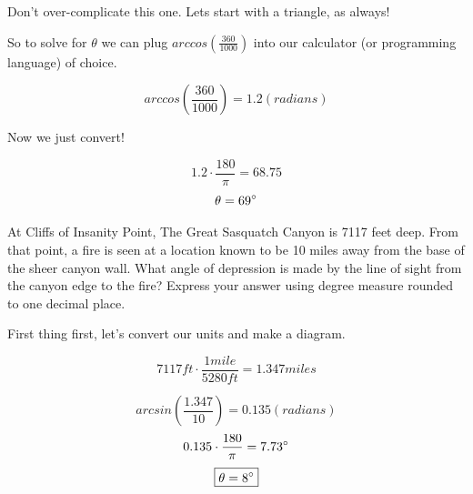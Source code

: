\documentclass[10pt,letterpaper]{amspset}
\begin{document}
\begin{solution}
    Don't over-complicate this one. Lets start with a triangle, as always!    
    
    
    So to solve for $\theta$ we can plug $arccos \left( \frac{360}{1000} \right)$ into our calculator (or programming language) of choice. 
    
    \[ arccos \left( \frac{360}{1000} \right) = 1.2 (radians)\]
    
    Now we just convert! 
    
    \[1.2 \cdot \frac{180}{\pi} = 68.75\]
    \[ \theta = 69\degree\]
\end{solution}


\begin{problem}[212]
    At Cliffs of Insanity Point, The Great Sasquatch Canyon is 7117 feet deep. From that point, a fire is seen at a location known to be 10 miles away from the base of the sheer canyon wall. What angle of depression is made by the line of sight from the canyon edge to the fire? Express your answer using degree measure rounded to one decimal place.
\end{problem}

\begin{solution}
    First thing first, let's convert our units and make a diagram. 
    
    \[ 7117ft \cdot \frac{1mile}{5280ft} = 1.347 miles\]
    
    
    
    \[ arcsin \left( \frac{1.347}{10} \right) = 0.135 (radians)\]
    \[ 0.135 \cdot \frac{180}{\pi} = 7.73\degree\]
    \[\boxed{ \theta = 8\degree }\]
\end{solution}
\end{document}
